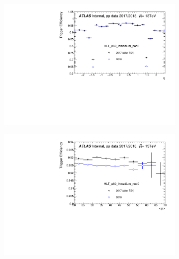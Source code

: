 \begin{figure}[h!tb]
\centering
\begin{subfigure}[c]{.48\textwidth}
\includegraphics[width=\textwidth]{sections/operation/figures/efficiencies/eff_EGAM1_e60_lhmedium_nod0_L1EM24VHI_2017_after_ts1_and_2018_eta.pdf}
\caption{}
\end{subfigure}
\hfill
\begin{subfigure}[c]{.48\textwidth}
\includegraphics[width=\textwidth]{sections/operation/figures/efficiencies/eff_EGAM1_e60_lhmedium_nod0_L1EM24VHI_2017_after_ts1_and_2018_mu.pdf}
\caption{}
\end{subfigure} \\
\begin{subfigure}[c]{.48\textwidth}

\end{subfigure}
\end{figure}
